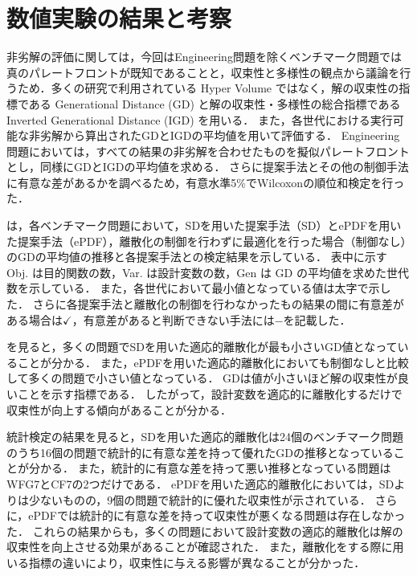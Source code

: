 \documentclass[../main/main]{subfiles}
\begin{document}
\section{数値実験の結果と考察}
非劣解の評価に関しては，今回はEngineering問題を除くベンチマーク問題では真のパレートフロントが既知であることと，収束性と多様性の観点から議論を行うため．多くの研究で利用されている Hyper Volume ではなく，解の収束性の指標である Generational Distance (GD) と解の収束性・多様性の総合指標である Inverted Generational Distance (IGD) を用いる．
また，各世代における実行可能な非劣解から算出されたGDとIGDの平均値を用いて評価する．
Engineering 問題においては，すべての結果の非劣解を合わせたものを擬似パレートフロントとし，同様にGDとIGDの平均値を求める．
さらに提案手法とその他の制御手法に有意な差があるかを調べるため，有意水準5\%でWilcoxonの順位和検定を行った．

\quad {}は，各ベンチマーク問題において，SDを用いた提案手法（SD）とePDFを用いた提案手法（ePDF），離散化の制御を行わずに最適化を行った場合（制御なし）のGDの平均値の推移と各提案手法との検定結果を示している．
表中に示す Obj. は目的関数の数，Var. は設計変数の数，Gen は GD の平均値を求めた世代数を示している．
また，各世代において最小値となっている値は太字で示した．
さらに各提案手法と離散化の制御を行わなかったもの結果の間に有意差がある場合は$\checkmark$，有意差があると判断できない手法には$-$を記載した．

を見ると，多くの問題でSDを用いた適応的離散化が最も小さいGD値となっていることが分かる．
また，ePDFを用いた適応的離散化においても制御なしと比較して多くの問題で小さい値となっている．
GDは値が小さいほど解の収束性が良いことを示す指標である．
したがって，設計変数を適応的に離散化するだけで収束性が向上する傾向があることが分かる．

統計検定の結果を見ると，SDを用いた適応的離散化は24個のベンチマーク問題のうち16個の問題で統計的に有意な差を持って優れたGDの推移となっていることが分かる．
また，統計的に有意な差を持って悪い推移となっている問題はWFG7とCF7の2つだけである．
ePDFを用いた適応的離散化においては，SDよりは少ないものの，9個の問題で統計的に優れた収束性が示されている．
さらに，ePDFでは統計的に有意な差を持って収束性が悪くなる問題は存在しなかった．
これらの結果からも，多くの問題において設計変数の適応的離散化は解の収束性を向上させる効果があることが確認された．
また，離散化をする際に用いる指標の違いにより，収束性に与える影響が異なることが分かった．
\end{document}
